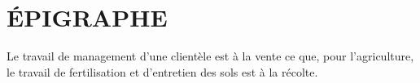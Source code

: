 \chapter*{ÉPIGRAPHE}
Le travail de management d’une clientèle est à la vente ce
que, pour l’agriculture, le travail de fertilisation et
d’entretien des sols est à la récolte.
